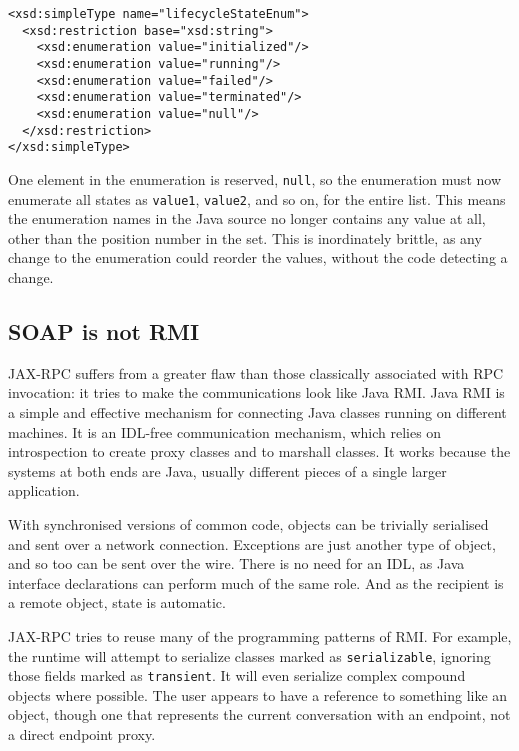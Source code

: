 \begin{verbatim}
<xsd:simpleType name="lifecycleStateEnum">
  <xsd:restriction base="xsd:string"> 
    <xsd:enumeration value="initialized"/> 
    <xsd:enumeration value="running"/> 
    <xsd:enumeration value="failed"/> 
    <xsd:enumeration value="terminated"/> 
    <xsd:enumeration value="null"/> 
  </xsd:restriction>
</xsd:simpleType>
\end{verbatim}

One element in the enumeration is reserved, \verb|null|, so the
enumeration must now enumerate all states as \verb|value1|,
\verb|value2|, and so on, for the entire list. This means the
enumeration names in the Java source no longer contains any value at
all, other than the position number in the set. This is inordinately
brittle, as any change to the enumeration could reorder the values,
without the code detecting a change.

\subsection{SOAP is not RMI}
\label{objections:soap-not-rmi}

JAX-RPC suffers from a greater flaw than those classically associated
with RPC invocation: it tries to make the communications look like
Java RMI. Java RMI is a simple and effective mechanism for connecting
Java classes running on different machines. It is an IDL-free
communication mechanism, which relies on introspection to create proxy
classes and to marshall classes. It works because the systems at both
ends are Java, usually different pieces of a single larger
application.

With synchronised versions of common code, objects can be trivially
serialised and sent over a network connection. Exceptions are just
another type of object, and so too can be sent over the wire. There is
no need for an IDL, as Java interface declarations can perform much of
the same role. And as the recipient is a remote object, state is
automatic.

JAX-RPC tries to reuse many of the programming patterns of RMI. For
example, the runtime will attempt to serialize classes marked as
\verb|serializable|, ignoring those fields marked as
\verb|transient|. It will even serialize complex compound objects where
possible. The user appears to have a reference to something like an
object, though one that represents the current conversation with an
endpoint, not a direct endpoint proxy.

